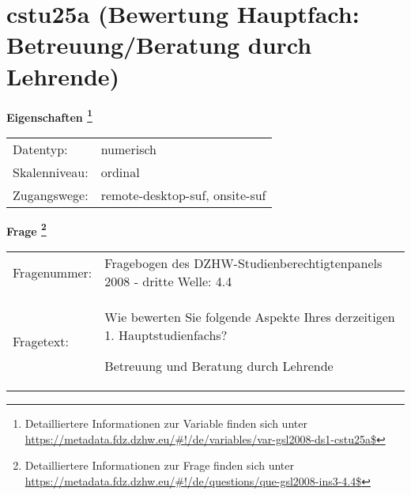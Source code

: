
    \setcounter{footnote}{0}

    \vspace*{-1.8cm}
	\section{cstu25a (Bewertung Hauptfach: Betreuung/Beratung durch Lehrende)}
	\label{section:cstu25a}



    \vspace*{0.5cm}
    \noindent\textbf{Eigenschaften
	\footnote{Detailliertere Informationen zur Variable finden sich unter
		\url{https://metadata.fdz.dzhw.eu/\#!/de/variables/var-gsl2008-ds1-cstu25a$}}}\\
	\begin{tabularx}{\hsize}{@{}lX}
	Datentyp: & numerisch \\
	Skalenniveau: & ordinal \\
	Zugangswege: &
	  remote-desktop-suf, 
	  onsite-suf
 \\
    \end{tabularx}



				\vspace*{0.5cm}
                \noindent\textbf{Frage
	                \footnote{Detailliertere Informationen zur Frage finden sich unter
		              \url{https://metadata.fdz.dzhw.eu/\#!/de/questions/que-gsl2008-ins3-4.4$}}}\\
				\begin{tabularx}{\hsize}{@{}lX}
					Fragenummer: &
					  Fragebogen des DZHW-Studienberechtigtenpanels 2008 - dritte Welle:
					  4.4
 \\
					Fragetext: & Wie bewerten Sie folgende Aspekte Ihres derzeitigen 1. Hauptstudienfachs?\par  Betreuung und Beratung durch Lehrende \\
				\end{tabularx}





